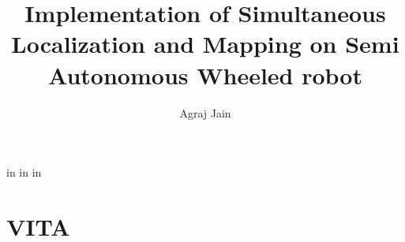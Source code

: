 
\renewcommand{\baselinestretch}{1.6}
\newtheorem{theorem}{Theorem}[chapter]
\newcommand{\btheorem}{\begin{theorem}\rm}
\newcommand{\etheorem}{$\diamond$\end{theorem}}
\newtheorem{definition}{Definition}[chapter]
\newcommand{\bdefn}{\begin{definition}\rm}
\newcommand{\edefn}{\end{definition}}
\newtheorem{lemma}{Lemma}[chapter]
\newtheorem{remark}{Remark}[chapter]
\newcommand{\bremark}{\begin{remark}\rm}
\newcommand{\eremark}{\end{remark}}
\newtheorem{example}{Example}[chapter]
\newcommand{\bexample}{\begin{example}\rm}
\newcommand{\eexample}{\end{example}}
\newtheorem{assumption}{Assumption}[chapter]
\newcommand{\bassump}{\begin{assumption}\rm}
\newcommand{\eassump}{\end{assumption}}

\title{Implementation of Simultaneous Localization and Mapping on Semi Autonomous Wheeled robot}
\author{Agraj Jain}
{} in
 in
 in
\chapter*{VITA}
\vitaentry{}{}
\vitaentry{}{}
\vitaentry{}{}
\setcounter{page}{1}



\tableofcontents
\listoffigures
\listoftables
\newpage
\setcounter{page}{1}






%
